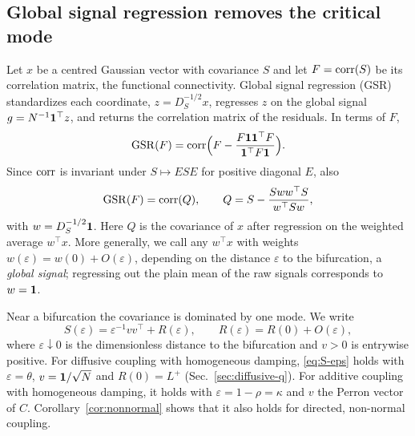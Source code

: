 
\subsection{Global signal regression removes the critical mode}\label{sec:gsr}

Let $x$ be a centred Gaussian vector with covariance $S$ and let $F=\operatorname{corr}(S)$ be its correlation
matrix, the functional connectivity. Global signal regression (GSR) standardizes each coordinate,
$z=D_S^{-1/2}x$, regresses $z$ on the global signal $g=N^{-1}\mathbf 1^\top z$, and returns the correlation
matrix of the residuals. In terms of $F$,
\begin{equation}\label{eq:gsr}
  \operatorname{GSR}(F)=\operatorname{corr}\Bigl(F-\frac{F\mathbf 1\mathbf 1^\top F}{\mathbf 1^\top F\mathbf 1}\Bigr).
\end{equation}
Since $\operatorname{corr}$ is invariant under $S\mapsto ESE$ for positive diagonal $E$, also
\begin{equation}\label{eq:gsr-S}
  \operatorname{GSR}(F)=\operatorname{corr}(Q),\qquad Q=S-\frac{Sww^\top S}{w^\top Sw},
\end{equation}
with $w=D_S^{-1/2}\mathbf 1$. Here $Q$ is the covariance of $x$ after regression on the weighted average
$w^\top x$. More generally, we call any $w^\top x$ with weights $w(\varepsilon)=w(0)+O(\varepsilon)$, depending on the distance $\varepsilon$ to
the bifurcation, a \emph{global signal}; regressing out the plain mean of the raw signals corresponds
to $w=\mathbf 1$.

Near a bifurcation the covariance is dominated by one mode. We write
\begin{equation}\label{eq:S-eps}
  S(\varepsilon)=\varepsilon^{-1}vv^\top+R(\varepsilon),\qquad R(\varepsilon)=R(0)+O(\varepsilon),
\end{equation}
where $\varepsilon\downarrow0$ is the dimensionless distance to the bifurcation and $v>0$ is entrywise
positive. For diffusive coupling with homogeneous damping, \eqref{eq:S-eps} holds with $\varepsilon=\theta$,
$v=\mathbf 1/\sqrt N$ and $R(0)=L^+$ (Sec.~\ref{sec:diffusive-q}). For additive coupling with homogeneous
damping, it holds with $\varepsilon=1-\rho=\kappa$ and $v$ the Perron vector of $C$. Corollary~\ref{cor:nonnormal}
shows that it also holds for directed, non-normal coupling.

